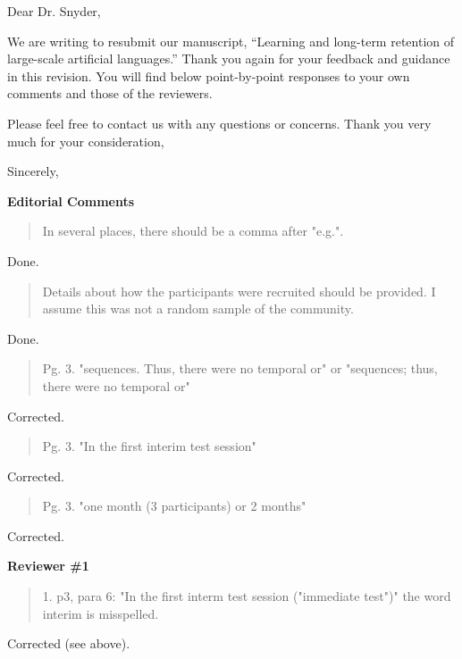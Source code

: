 \documentclass[12pt]{letter}
\begin{document}
\begin{letter}

Dear Dr. Snyder,

We are writing to resubmit our manuscript, ``Learning and long-term retention of large-scale artificial languages.'' Thank you again for your feedback and guidance in this revision. You will find below point-by-point responses to your own comments and those of the reviewers.

Please feel free to contact us with any questions or concerns. Thank you very much for your consideration,

\closing{Sincerely,}

\end{letter}

\newpage

{\bf Editorial Comments}

\begin{quote}
In several places, there should be a comma after "e.g.".
\end{quote}

Done. 

\begin{quote}
Details about how the participants were recruited should be provided. I assume this was not a random sample of the community.
\end{quote}

Done.

\begin{quote}
Pg. 3. "sequences. Thus, there were no temporal or" or "sequences; thus, there were no temporal or"
\end{quote}

Corrected.

\begin{quote}
Pg. 3. "In the first interim test session"
\end{quote}

Corrected. 

\begin{quote}
Pg. 3. "one month (3 participants) or 2 months"
\end{quote}

Corrected.

{\bf Reviewer \#1}

\begin{quote}
1. p3, para 6: "In the first interm test session ("immediate test")" the word interim is misspelled.
\end{quote}

Corrected (see above). 
\end{document}
